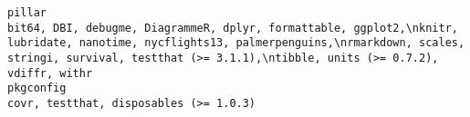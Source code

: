 \documentclass[
  letterpaper,
  DIV=11,
  numbers=noendperiod]{scrreprt}
\begin{document}
\begin{verbatim}
pillar                                                                                                                                                                                                                                                                                                                                                                                                                                                                                                                                                                                                                                                                                                                                                                                                                                                                                                                                                                                                                                                                          bit64, DBI, debugme, DiagrammeR, dplyr, formattable, ggplot2,\nknitr, lubridate, nanotime, nycflights13, palmerpenguins,\nrmarkdown, scales, stringi, survival, testthat (>= 3.1.1),\ntibble, units (>= 0.7.2), vdiffr, withr
pkgconfig                                                                                                                                                                                                                                                                                                                                                                                                                                                                                                                                                                                                                                                                                                                                                                                                                                                                                                                                                                                                                                                                                                                                                                                                                                                              covr, testthat, disposables (>= 1.0.3)

\end{verbatim}
\end{document}

